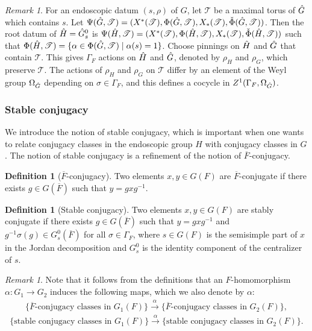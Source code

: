 \documentclass[11pt,a4paper]{article}
\theoremstyle{definition}
\newtheorem{D}[shared]{Definition}
\theoremstyle{plain}
\theoremstyle{remark}
\newtheorem{R}[shared]{Remark}
\theoremstyle{plain}
\begin{document}
\begin{R}\label{rootdataendogrp}
    For an endoscopic datum $(s, \rho)$ of $G$, let $\mathscr{T}$ be a maximal torus of $\Hat{G}$ which contains $s$. Let $\Psi(\Hat{G}, \mathscr{T}) = (X^*(\mathscr{T}), \Phi( \Hat{G}, \mathscr{T}), X_*(\mathscr{T}), \Check{\Phi}( \Hat{G}, \mathscr{T}))$. Then the root datum of $\Hat{H} = \Hat{G}_s^0$ is $\Psi(\Hat{H}, \mathscr{T}) = (X^*(\mathscr{T}), \Phi( \Hat{H}, \mathscr{T}), X_*(\mathscr{T}), \Check{\Phi}( \Hat{H}, \mathscr{T}))$ such that $\Phi(\Hat{H}, \mathscr{T}) = \{ \alpha \in \Phi(\Hat{G}, \mathscr{T}) \mid \alpha(s) = 1 \}$. Choose pinnings on $\Hat{H}$ and $\Hat{G}$ that contain $\mathscr{T}$. This gives $\Gamma_F$ actions on $\Hat{H}$ and $\Hat{G}$, denoted by $\rho_H$ and $\rho_G$, which preserve $\mathscr{T}$. The actions of $\rho_H$ and $\rho_G$ on $\mathscr{T}$ differ by an element of the Weyl group $\Omega_{\Hat{G}}$ depending on $\sigma \in \Gamma_F$, and this defines a cocycle in $Z^1(\Gamma_F, \Omega_{\Hat{G}})$.
\end{R}

\subsubsection{Stable conjugacy} 
We introduce the notion of stable conjugacy, which is important when one wants to relate conjugacy classes in the endoscopic group $H$ with conjugacy classes in $G$. The notion of stable conjugacy is a refinement of the notion of $\overline{F}$-conjugacy.

\begin{D}[$\overline{F}$-conjugacy]\label{Fbarconjugacy}
    Two elements $x, y \in G(F)$ are $\overline{F}$-conjugate if there exists $g \in G(\overline{F})$ such that $y = gxg^{-1}$.
\end{D}

\begin{D}[Stable conjugacy]\label{StableConjugacy}
    Two elements $x, y \in G(F)$ are stably conjugate if there exists $g \in G(\overline{F})$ such that $y = gxg^{-1}$ and $g^{-1}\sigma(g) \in G_s^0(\overline{F})$ for all $\sigma \in \Gamma_F$, where $s \in G(F)$ is the semisimple part of $x$ in the Jordan decomposition and $G_s^0$ is the identity component of the centralizer of $s$.
\end{D}

\begin{R}\label{rmkaboutstableconj}
    Note that it follows from the definitions that an $F$-homomorphism $\alpha: G_1 \xrightarrow[]{} G_2$ induces the following maps, which we also denote by $\alpha$:
    $$ \{ \overline{F} \text{-conjugacy classes in } G_1(F) \} \xrightarrow[]{\alpha} \{ \overline{F} \text{-conjugacy classes in } G_2(F) \},$$
    $$ \{ \text{stable conjugacy classes in } G_1(F) \} \xrightarrow[]{\alpha} \{ \text{stable conjugacy classes in } G_2(F) \}.$$
\end{R}
\end{document}
